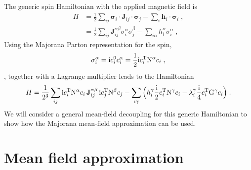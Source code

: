 



The generic spin Hamiltonian  with the applied magnetic field is
\begin{equation}
\begin{split}
    H   &=\frac{1}{2}\sum_{ ij }  \bm{\sigma}_i \cdot \mathbf{J}_{ij} \cdot \bm{\sigma}_j  - \sum_i \mathbf{h}_i \cdot \bm{\sigma}_i    \; ,\\
         &=\frac{1}{2}\sum_{ ij } \mathbf{J}_{ij}^{\alpha\beta}    \sigma_i^\alpha  \sigma_j^\beta  - \sum_{i\alpha} h_i^\alpha \sigma_i^\alpha    \; ,
\end{split}
\end{equation}
Using the Majorana Parton representation for the spin,
\begin{equation}
    \sigma_i^\alpha = \mathrm{i} c_i^0 c_i^\alpha =  \frac12 \mathrm{i} c_i^{{\mathrm{T}}} \mathrm{N}^\alpha  c_i \; ,
\end{equation},
together with a Lagrange multiplier leads to the Hamiltonian
\begin{equation}
    H   =\frac{1}{2^3}\sum_{ ij }
         \mathrm{i} c_i^{{\mathrm{T}}} \mathrm{N}^\alpha  c_i  \,  \mathbf{J}_{ij}^{\alpha\beta} \,  \mathrm{i} c_j^{{\mathrm{T}}} \mathrm{N}^\beta  c_j
         -\sum_{i\gamma} \Big( h_i^\gamma  \frac{\mathrm{i}}{2} c_i^{{\mathrm{T}}} \mathrm{N}^\gamma  c_i - \lambda_i^\gamma \frac{\mathrm{i}}{4} c_i^{{\mathrm{T}}} \mathrm{G}^\gamma  c_i  \Big)    \; . \label{B:H-full}
\end{equation}
We will consider a general mean-field decoupling for this generic Hamiltonian to show how the Majorana mean-field approximation can be used.

\section{Mean field approximation}

